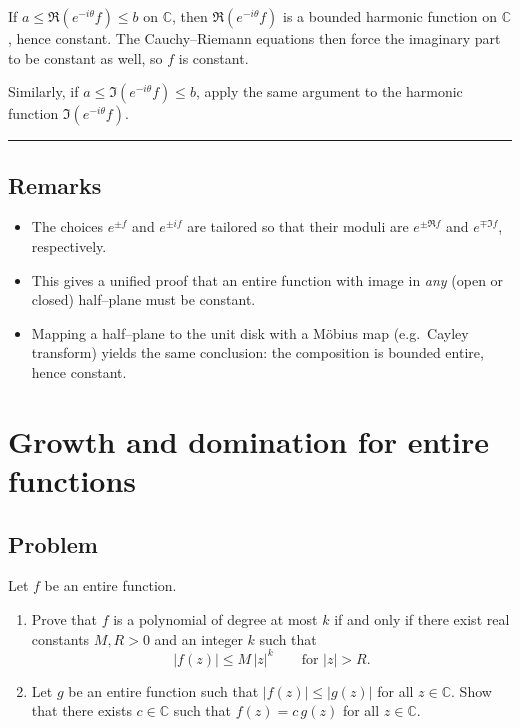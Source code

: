 \documentclass[11pt]{article}
\begin{document}
If $a\le \Re(e^{-i\theta} f)\le b$ on $\mathbb{C}$, then $\Re(e^{-i\theta} f)$ is a bounded harmonic function on $\mathbb{C}$, hence constant. The Cauchy--Riemann equations then force the imaginary part to be constant as well, so $f$ is constant.

\medskip

Similarly, if $a\le \Im(e^{-i\theta} f)\le b$, apply the same argument to the harmonic function $\Im(e^{-i\theta} f)$.

\bigskip\hrule\bigskip

\subsection*{Remarks}

\begin{itemize}
	\item The choices $e^{\pm f}$ and $e^{\pm i f}$ are tailored so that their moduli are $e^{\pm \Re f}$ and $e^{\mp \Im f}$, respectively.
	\item This gives a unified proof that an entire function with image in \emph{any} (open or closed) half–plane must be constant.
	\item Mapping a half–plane to the unit disk with a Möbius map (e.g.\ Cayley transform) yields the same conclusion: the composition is bounded entire, hence constant.
\end{itemize}
	
	
\section*{Growth and domination for entire functions}

\subsection*{Problem}
Let $f$ be an entire function.

\begin{enumerate}
	\item[(i)] Prove that $f$ is a polynomial of degree at most $k$ if and only if there exist real constants $M,R>0$ and an integer $k$ such that
	\[
	|f(z)|\le M\,|z|^{k}\qquad\text{for }|z|>R.
	\]
	\item[(ii)] Let $g$ be an entire function such that $|f(z)|\le |g(z)|$ for all $z\in\mathbb C$.
	Show that there exists $c\in\mathbb C$ such that $f(z)=c\,g(z)$ for all $z\in\mathbb C$.
\end{enumerate}
\end{document}
